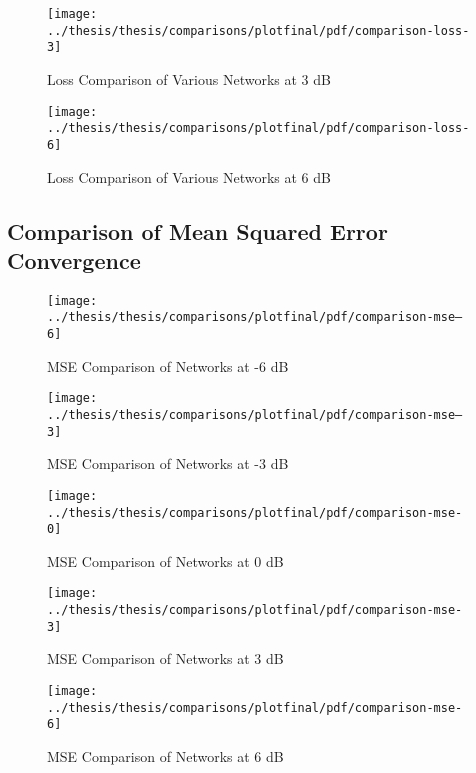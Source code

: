 \begin{figure}[!ht]
\centering
\texttt{[image: ../thesis/thesis/comparisons/plotfinal/pdf/comparison-loss-3]}
\caption{Loss Comparison of Various Networks at 3 dB}
\end{figure}

\begin{figure}[!ht]
\centering
\texttt{[image: ../thesis/thesis/comparisons/plotfinal/pdf/comparison-loss-6]}
\caption{Loss Comparison of Various Networks at 6 dB}
\end{figure}



\subsection{Comparison of Mean Squared Error Convergence}

\begin{figure}[!ht]
\centering
\texttt{[image: ../thesis/thesis/comparisons/plotfinal/pdf/comparison-mse--6]}
\caption{MSE Comparison of Networks at -6 dB}
\end{figure}

\begin{figure}[!ht]
\centering
\texttt{[image: ../thesis/thesis/comparisons/plotfinal/pdf/comparison-mse--3]}
\caption{MSE Comparison of Networks at -3 dB}
\end{figure}

\begin{figure}[!ht]
\centering
\texttt{[image: ../thesis/thesis/comparisons/plotfinal/pdf/comparison-mse-0]}
\caption{MSE Comparison of Networks at 0 dB}
\end{figure}

\begin{figure}[!ht]
\centering
\texttt{[image: ../thesis/thesis/comparisons/plotfinal/pdf/comparison-mse-3]}
\caption{MSE Comparison of Networks at 3 dB}
\end{figure}

\begin{figure}[!ht]
\centering
\texttt{[image: ../thesis/thesis/comparisons/plotfinal/pdf/comparison-mse-6]}
\caption{MSE Comparison of Networks at 6 dB}
\end{figure}

